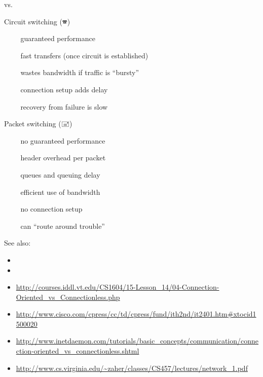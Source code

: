 \begin{frame}{\scalebox{1.5}{🕿}\quad vs.\quad\scalebox{1.5}{🖃}}
  \begin{minipage}[t]{.47\linewidth}
    \begin{iblock}{Circuit switching (🕿)}
      \begin{itemize}
      \item[🙂] guaranteed performance
      \item[🙂] fast transfers (once circuit is established)
      \item[\alert{🙁}] wastes bandwidth if traffic is ``bursty''
      \item[\alert{🙁}] connection setup adds delay
      \item[\alert{🙁}] recovery from failure is slow
      \end{itemize}
    \end{iblock}
  \end{minipage}\hfill
  \begin{minipage}[t]{.47\linewidth}
    \begin{iblock}{Packet switching (🖃)}
      \begin{itemize}
      \item[\alert{🙁}] no guaranteed performance
      \item[\alert{🙁}] header overhead per packet
      \item[\alert{🙁}] queues and queuing delay
      \item[🙂] efficient use of bandwidth
      \item[🙂] no connection setup
      \item[🙂] can ``route around trouble''
      \end{itemize}
    \end{iblock}
  \end{minipage}
\end{frame}

See also:
\begin{itemize}
\item {}
\item {}
\item
  \url{http://courses.iddl.vt.edu/CS1604/15-Lesson_14/04-Connection-Oriented_vs_Connectionless.php}
\item \url{http://www.cisco.com/cpress/cc/td/cpress/fund/ith2nd/it2401.htm#xtocid1500020}
\item
  \url{http://www.inetdaemon.com/tutorials/basic_concepts/communication/connection-oriented_vs_connectionless.shtml}
\item \url{http://www.cs.virginia.edu/~zaher/classes/CS457/lectures/network_1.pdf}
\end{itemize}

